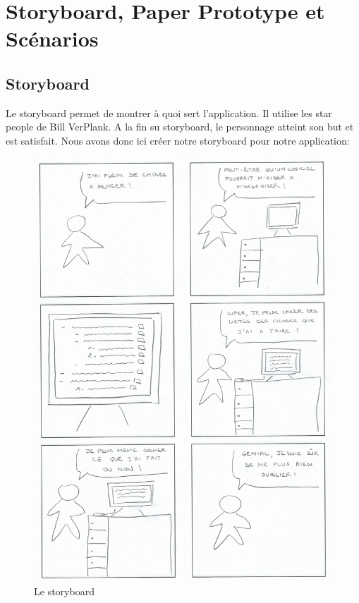 \documentclass[a4paper,10pt]{article}
\begin{document}
\newpage
\section{Storyboard, Paper Prototype et Scénarios}

\subsection{Storyboard}
Le storyboard permet de montrer à quoi sert l'application. Il utilise les star people de Bill VerPlank. A la fin su storyboard, le personnage atteint son but et est satisfait. Nous avons donc ici créer notre storyboard pour notre application:
\begin{figure}[H]
    \center
    \includegraphics[width=13.9cm]{Images/storyboard.png}
    \caption{Le storyboard}
\end{figure}
\end{document}
